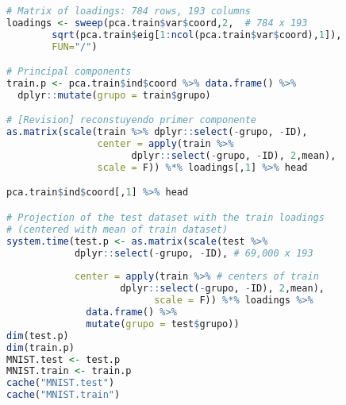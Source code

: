 \begin{lstlisting}[language=R, basicstyle=\small]
# Matrix of loadings: 784 rows, 193 columns 
loadings <- sweep(pca.train$var$coord,2,  # 784 x 193
        sqrt(pca.train$eig[1:ncol(pca.train$var$coord),1]),
        FUN="/")

# Principal components 
train.p <- pca.train$ind$coord %>% data.frame() %>% 
  dplyr::mutate(grupo = train$grupo)

# [Revision] reconstuyendo primer componente 
as.matrix(scale(train %>% dplyr::select(-grupo, -ID), 
                center = apply(train %>% 
                      dplyr::select(-grupo, -ID), 2,mean), 
                scale = F)) %*% loadings[,1] %>% head

pca.train$ind$coord[,1] %>% head

# Projection of the test dataset with the train loadings 
# (centered with mean of train dataset)
system.time(test.p <- as.matrix(scale(test %>% 
            dplyr::select(-grupo, -ID), # 69,000 x 193
                                      
            center = apply(train %>% # centers of train
                    dplyr::select(-grupo, -ID), 2,mean), 
                          scale = F)) %*% loadings %>% 
              data.frame() %>% 
              mutate(grupo = test$grupo))
dim(test.p)
dim(train.p)
MNIST.test <- test.p
MNIST.train <- train.p
cache("MNIST.test")
cache("MNIST.train")
\end{lstlisting}

